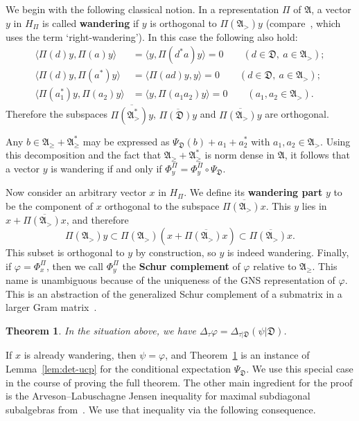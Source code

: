 \documentclass[12pt,a4paper]{article}
\numberwithin{equation}{section}
\newtheorem{thm}{Theorem}[section]
\theoremstyle{remark}
\newcommand{\A}{\mathfrak{A}}
\newcommand{\frD}{\mathfrak{D}}
\renewcommand{\phi}{\varphi}
\newcommand{\ol}[1]{\overline{#1}}
\begin{document}
We begin with the following classical notion.  In a representation $\Pi$ of $\A$, a vector $y$ in $H_\Pi$ is called \textbf{wandering} if $y$ is orthogonal to $\Pi(\A_>)y$ (compare~\cite[Sec. 4.1]{Arv67}, which uses the term `right-wandering').  In this case the following also hold:
\begin{align*}
\langle \Pi(d)y,\Pi(a)y\rangle &= \langle y,\Pi(d^\ast a)y\rangle = 0\qquad (d \in \frD,\ a \in \A_>);\\
\langle \Pi(d)y,\Pi(a^\ast)y\rangle &= \langle \Pi(ad)y,y\rangle = 0\qquad (d \in \frD,\ a \in \A_>);\\
\langle \Pi(a_1^\ast)y,\Pi(a_2)y\rangle &= \langle y,\Pi(a_1a_2)y\rangle = 0 \qquad (a_1,a_2 \in \A_>).
\end{align*}
Therefore the subspaces $\ol{\Pi(\A_>^\ast)y}$, $\ol{\Pi(\frD)y}$ and $\ol{\Pi(\A_>)y}$ are orthogonal.

Any $b \in \A_\ge + \A_\ge^\ast$ may be expressed as $\Psi_\frD(b) + a_1 + a_2^\ast$ with $a_1,a_2 \in \A_>$.  Using this decomposition and the fact that $\A_\ge + \A_\ge^\ast$ is norm dense in $\A$, it follows that a vector $y$ is wandering if and only if $\Phi_y^\Pi = \Phi_y^\Pi \circ \Psi_\frD$.

Now consider an arbitrary vector $x$ in $H_\Pi$.  We define its \textbf{wandering part} $y$ to be the component of $x$ orthogonal to the subspace $\ol{\Pi(\A_>)x}$.  This $y$ lies in $x + \ol{\Pi(\A_>)x}$, and therefore
\[\Pi(\A_>)y \subset \Pi(\A_>)(x + \ol{\Pi(\A_>)x}) \subset \ol{\Pi(\A_>)x}.\]
This subset is orthogonal to $y$ by construction, so $y$ is indeed wandering.  Finally, if $\phi = \Phi^\Pi_x$, then we call $\Phi^\Pi_y$ the \textbf{Schur complement} of $\phi$ relative to $\A_{\ge}$.   This name is unambiguous because of the uniqueness of the GNS representation of $\phi$.  This is an abstraction of the generalized Schur complement of a submatrix in a larger Gram matrix~\cite[Exers. 7.1.P28, 7.3.P8]{HorJohMA}.

\begin{thm}\label{thm:subdiag-Szego}
In the situation above, we have $\Delta_\tau \phi = \Delta_{\tau|\frD}(\psi|\frD)$.
\end{thm}

If $x$ is already wandering, then $\psi = \phi$, and Theorem~\ref{thm:subdiag-Szego} is an instance of Lemma~\ref{lem:det-ucp} for the conditional expectation $\Psi_\frD$.  We use this special case in the course of proving the full theorem.  The other main ingredient for the proof is the Arveson--Labuschagne Jensen inequality for maximal subdiagonal subalgebras from~\cite{Lab05}.  We use that inequality via the following consequence.
\end{document}
